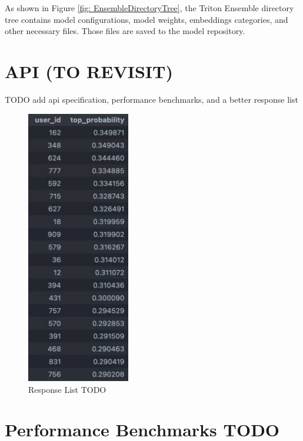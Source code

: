 As shown in Figure \ref{fig: EnsembleDirectoryTree}, the Triton Ensemble directory tree contains model configurations, model weights, embeddings categories, and other necessary files.
Those files are saved to the model repository.

\section{API (TO REVISIT)}

TODO add api specification, performance benchmarks, and a better response list

\begin{figure}[H]
    \centering
    \includegraphics[width=0.4\textwidth]{assets/response_list.jpg}
    \caption{Response List TODO}
    \label{fig:ResponseList}
\end{figure}


\section{Performance Benchmarks TODO }
